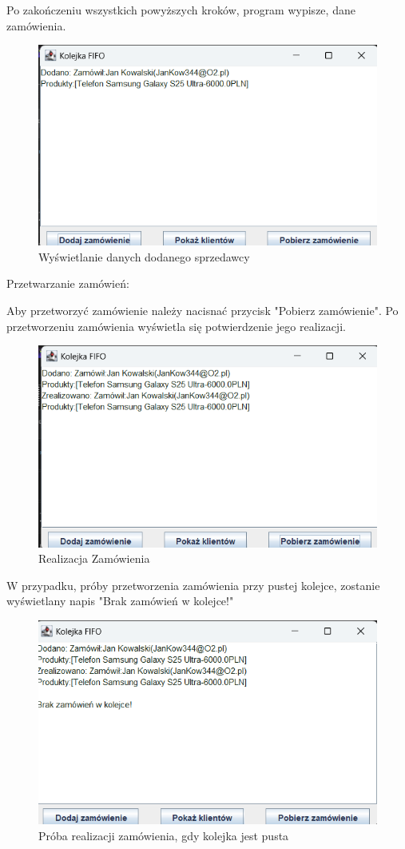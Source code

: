 Po zakończeniu wszystkich powyższych kroków, program wypisze, dane zamówienia.
\begin{figure}[H]
	\centering
	\includegraphics[width=0.7\linewidth]{figures/screenshot007}
	\caption{Wyświetlanie danych dodanego sprzedawcy}
	\label{fig:screenshot007}
\end{figure}


Przetwarzanie zamówień:

Aby przetworzyć zamówienie należy nacisnać przycisk "Pobierz zamówienie". Po przetworzeniu zamówienia
wyświetla się potwierdzenie jego realizacji.
\begin{figure}[H]
	\centering
	\includegraphics[width=0.7\linewidth]{figures/screenshot008}
	\caption{Realizacja Zamówienia}
	\label{fig:screenshot008}
\end{figure}
W przypadku, próby przetworzenia zamówienia przy pustej kolejce, zostanie wyświetlany napis "Brak
zamówień w kolejce!"
\begin{figure}[H]
	\centering
	\includegraphics[width=0.7\linewidth]{figures/screenshot009}
	\caption{Próba realizacji zamówienia, gdy kolejka jest pusta}
	\label{fig:screenshot009}
\end{figure}

